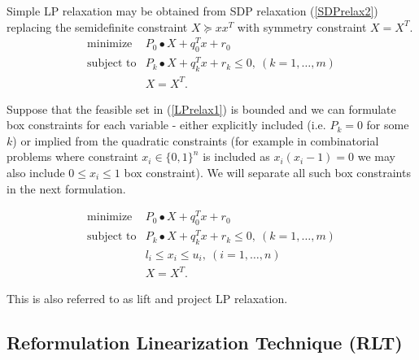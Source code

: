 \documentclass[12pt]{book}
\theoremstyle{definition}
\begin{document}
Simple LP relaxation may be obtained from SDP relaxation (\ref{SDPrelax2}) replacing the semidefinite constraint $X\succeq xx^T$ with symmetry constraint $X = X^T$.
\begin{equation}
\label{LPrelax1} 
\begin{array}{ll}
\mbox{minimize}& P_0\bullet X + q_0^Tx + r_0\\
\mbox{subject to}& P_k\bullet X+ q_k^Tx + r_k \leq 0, \  (k = 1,\dots ,m)\\
& X = X^T.
\end{array} 
\end{equation}

Suppose that the feasible set in (\ref{LPrelax1}) is bounded and we can formulate box constraints for each variable - either explicitly included (i.e.  $P_k=0$ for some $k$) or implied from the quadratic constraints (for example in combinatorial problems where constraint $x_i\in \{0,1\}^n$ is included as $x_i(x_i-1) = 0$ we may also include $0\leq x_i \leq 1$ box constraint). We will separate all such box constraints in the next formulation. 

\begin{equation}
\label{LPrelax2} 
\begin{array}{ll}
\mbox{minimize}& P_0\bullet X + q_0^Tx + r_0\\
\mbox{subject to}& P_k\bullet X+ q_k^Tx + r_k \leq 0, \  (k = 1,\dots ,m)\\
 				& l_i\leq x_i \leq u_i, \ (i = 1,\dots ,n)\\
& X = X^T.
\end{array} 
\end{equation}

This is also referred to as lift and project LP relaxation. 

\subsection{Reformulation Linearization Technique (RLT)}
\end{document}
